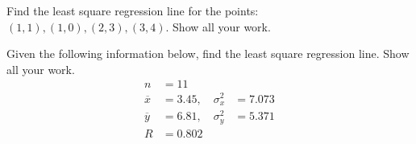 \documentclass[11pt,letterpaper]{article}
\begin{document}

 Find the least square regression line for the points: $(1, 1), (1,0), (2,3), (3,4)$. Show all your work. 





\newpage





 Given the following information below, find the least square regression line. Show all your work. 
	\[
	\begin{aligned}
	n&= 11 \\
	\overline{x}&= 3.45, \quad \sigma_x^2&= 7.073 \\
	\overline{y}&= 6.81, \quad \sigma_y^2&= 5.371 \\
	R&= 0.802
	\end{aligned}
	\]





\newpage
\end{document}
